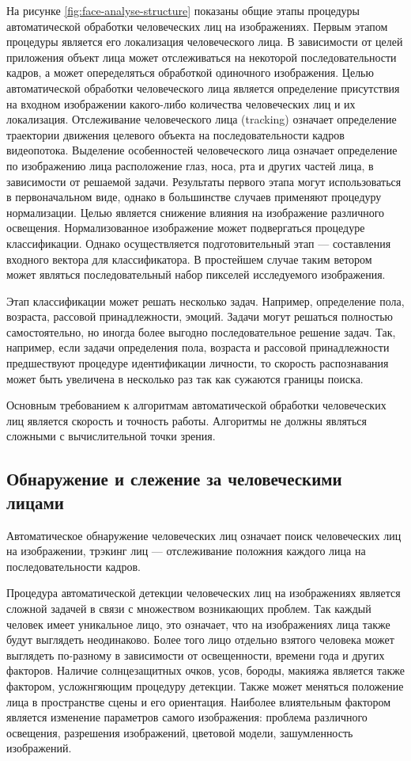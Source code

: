 На рисунке \ref{fig:face-analyse-structure} показаны общие этапы процедуры автоматической обработки человеческих лиц на изображениях. Первым этапом процедуры является его локализация человеческого лица. В зависимости от целей приложения объект лица может отслеживаться на некоторой последовательности кадров, а может опеределяться обработкой одиночного изображения. Целью автоматической обработки человеческого лица является определение присутствия на входном изображении какого-либо количества человеческих лиц и их локализация. Отслеживание человеческого лица (tracking) означает определение траектории движения целевого объекта на последовательности кадров видеопотока. Выделение особенностей человеческого лица означает определение по изображению лица расположение глаз, носа, рта и других частей лица, в зависимости от решаемой задачи. Результаты первого этапа могут использоваться в первоначальном виде, однако в большинстве случаев применяют процедуру нормализации. Целью является снижение влияния на изображение различного освещения. Нормализованное изображение может подвергаться процедуре классификации. Однако осуществляется подготовительный этап --- составления входного вектора для классификатора. В простейшем случае таким ветором может являться последовательный набор пикселей исследуемого изображения.

Этап классификации может решать несколько задач. Например, определение пола, возраста, рассовой принадлежности, эмоций. Задачи могут решаться полностью самостоятельно, но иногда более выгодно последовательное решение задач. Так, например, если задачи определения пола, возраста и рассовой принадлежности предшествуют процедуре идентификации личности, то скорость распознавания может быть увеличена в несколько раз так как сужаются границы поиска.


Основным требованием к алгоритмам автоматической обработки человеческих лиц является скорость и точность работы. Алгоритмы не должны являться сложными с вычислительной точки зрения.



\subsection{Обнаружение и слежение за человеческими лицами}

Автоматическое обнаружение человеческих лиц означает поиск человеческих лиц на изображении, трэкинг лиц --- отслеживание положния каждого лица на последовательности кадров.


Процедура автоматической детекции человеческих лиц на изображениях является сложной задачей в связи с множеством возникающих проблем. Так каждый человек имеет уникальное лицо, это означает, что на изображениях лица также будут выглядеть неодинаково. Более того лицо отдельно взятого человека может выглядеть по-разному в зависимости от освещенности, времени года и других факторов. Наличие солнцезащитных очков, усов, бороды, макияжа является также фактором, усложнгяющим процедуру детекции. Также может меняться  положение лица в пространстве сцены и его ориентация. Наиболее влиятельным фактором является изменение параметров самого изображения: проблема различного освещения, разрешения изображений, цветовой модели, зашумленность изображений.

